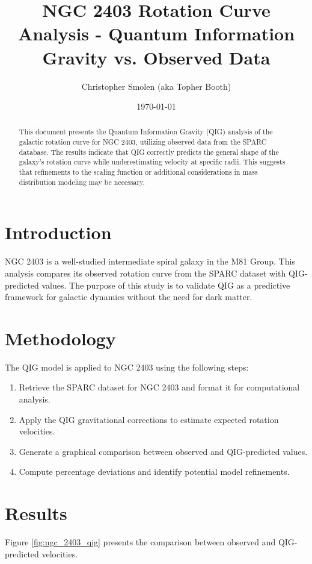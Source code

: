 \documentclass{article}
\begin{document}
\title{NGC 2403 Rotation Curve Analysis - Quantum Information Gravity vs. Observed Data}
\author{Christopher Smolen (aka Topher Booth)}
\date{\today}
\maketitle

\begin{abstract}
This document presents the Quantum Information Gravity (QIG) analysis of the galactic rotation curve for NGC 2403, utilizing observed data from the SPARC database. The results indicate that QIG correctly predicts the general shape of the galaxy's rotation curve while underestimating velocity at specific radii. This suggests that refinements to the scaling function or additional considerations in mass distribution modeling may be necessary.
\end{abstract}

\section{Introduction}
NGC 2403 is a well-studied intermediate spiral galaxy in the M81 Group. This analysis compares its observed rotation curve from the SPARC dataset with QIG-predicted values. The purpose of this study is to validate QIG as a predictive framework for galactic dynamics without the need for dark matter.

\section{Methodology}
The QIG model is applied to NGC 2403 using the following steps:
\begin{enumerate}
    \item Retrieve the SPARC dataset for NGC 2403 and format it for computational analysis.
    \item Apply the QIG gravitational corrections to estimate expected rotation velocities.
    \item Generate a graphical comparison between observed and QIG-predicted values.
    \item Compute percentage deviations and identify potential model refinements.
\end{enumerate}

\section{Results}
Figure \ref{fig:ngc_2403_qig} presents the comparison between observed and QIG-predicted velocities.
\end{document}
